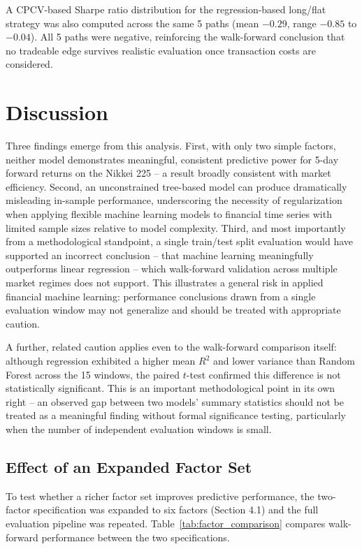 \documentclass[11pt]{article}
\begin{document}
A CPCV-based Sharpe ratio distribution for the regression-based
long/flat strategy was also computed across the same 5 paths (mean
$-0.29$, range $-0.85$ to $-0.04$). All 5 paths were negative, reinforcing
the walk-forward conclusion that no tradeable edge survives realistic
evaluation once transaction costs are considered. 

\section{Discussion}

Three findings emerge from this analysis. First, with only two simple factors, neither model demonstrates meaningful, consistent predictive power for 5-day forward returns on the Nikkei 225 -- a result broadly consistent with market efficiency. Second, an unconstrained tree-based model can produce dramatically misleading in-sample performance, underscoring the necessity of regularization when applying flexible machine learning models to financial time series with limited sample sizes relative to model complexity. Third, and most importantly from a methodological standpoint, a single train/test split evaluation would have supported an incorrect conclusion -- that machine learning meaningfully outperforms linear regression -- which walk-forward validation across multiple market regimes does not support. This illustrates a general risk in applied financial machine learning: performance conclusions drawn from a single evaluation window may not generalize and should be treated with appropriate caution.

A further, related caution applies even to the walk-forward comparison itself: although regression exhibited a higher mean $R^2$ and lower variance than Random Forest across the 15 windows, the paired $t$-test confirmed this difference is not statistically significant. This is an important methodological point in its own right -- an observed gap between two models' summary statistics should not be treated as a meaningful finding without formal significance testing, particularly when the number of independent evaluation windows is small.

\subsection{Effect of an Expanded Factor Set}

To test whether a richer factor set improves predictive performance, the two-factor specification was expanded to six factors (Section 4.1) and the full evaluation pipeline was repeated. Table~\ref{tab:factor_comparison} compares walk-forward performance between the two specifications.
\end{document}
